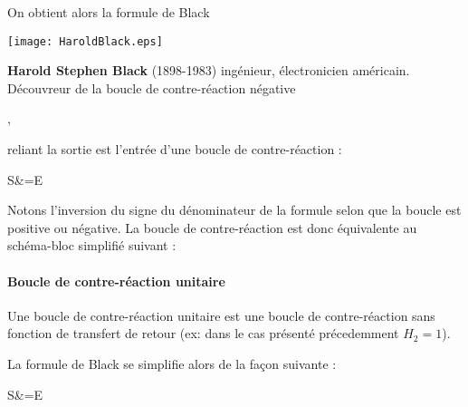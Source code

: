 On obtient alors la formule de Black
\begin{marginfigure}
    \centering
    \texttt{[image: HaroldBlack.eps]}
    \caption*{\textbf{Harold Stephen Black} (1898-1983) 
              ingénieur, électronicien américain. Découvreur de la boucle de 
              contre-réaction négative}, 
\end{marginfigure}
reliant la sortie est l'entrée d'une boucle de contre-réaction :
\begin{bequation}
    S&=E
\end{bequation}
Notons l'inversion du signe du dénominateur de la formule 
selon que la boucle est positive ou négative.
La boucle de contre-réaction est donc équivalente au schéma-bloc 
simplifié suivant :
\begin{center}
    
\end{center}
\newpage
\restoregeometry
\captionsetup{width=0.9\linewidth}
\paragraph{Boucle de contre-réaction unitaire}
Une boucle de contre-réaction unitaire est une boucle de contre-réaction sans 
fonction de transfert de retour (ex: dans le cas présenté précedemment $H_2=1$).
\begin{center}
    
\end{center}
La formule de Black se simplifie alors de la façon suivante :
\begin{bequation}
    S&=E
\end{bequation}
